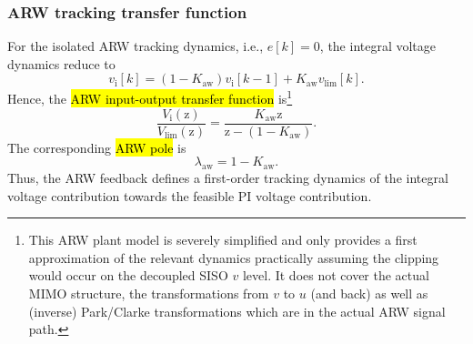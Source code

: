 \begin{frame}
    \frametitle{ARW tracking transfer function}
    For the isolated ARW tracking dynamics, i.e., $e[k]=0$, the integral voltage dynamics reduce to
    \begin{equation}
        v_{\mathrm{i}}[k]
        =
        (1-K_{\mathrm{aw}})v_{\mathrm{i}}[k-1]
        +
        K_{\mathrm{aw}}v_{\mathrm{lim}}[k].
        \label{eq:arw_isolated_tracking}
    \end{equation}\pause%
    Hence, the \hl{ARW input-output transfer function} is\footnote{This ARW plant model is severely simplified and only provides a first approximation of the relevant dynamics practically assuming the clipping would occur on the decoupled SISO $v$ level. It does not cover the actual MIMO structure, the transformations from $v$ to $u$ (and back) as well as (inverse) Park/Clarke transformations which are in the actual ARW signal path.}
    \begin{equation}
        \frac{V_{\mathrm{i}}(\mathrm{z})}{V_{\mathrm{lim}}(\mathrm{z})}
        =
        \frac{K_{\mathrm{aw}}\mathrm{z}}{\mathrm{z}-(1-K_{\mathrm{aw}})}.
        \label{eq:arw_tracking_tf}
    \end{equation}\pause%
    The corresponding \hl{ARW pole} is
    \begin{equation}
        \lambda_{\mathrm{aw}}
        =
        1-K_{\mathrm{aw}}.
        \label{eq:arw_pole}
    \end{equation}\pause%
    Thus, the ARW feedback defines a first-order tracking dynamics of the integral voltage
    contribution towards the feasible PI voltage contribution.
\end{frame}

